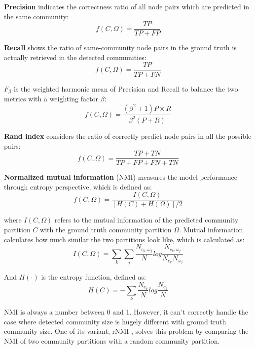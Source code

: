 \textbf{Precision} indicates the correctness ratio of all node pairs which are predicted in the same community:
\begin{equation}
f(C,\Omega) = \frac{TP}{TP+FP} 
\end{equation}

\textbf{Recall} shows the ratio of same-community node pairs in the ground truth is actually retrieved in the detected communities:
\begin{equation}
f(C,\Omega) = \frac{TP}{TP+FN} 
\end{equation}

\textbf{$F_\beta$} is the weighted harmonic mean of Precision and Recall to balance the two metrics with a weighting factor $\beta$:
\begin{equation}
f(C,\Omega) =\frac{(\beta^{2}+1)P\times R}{\beta^{2}(P+R)} 
\end{equation}

\textbf{Rand index} considers the ratio of correctly predict node pairs in all the possible pairs:
\begin{equation}
f(C,\Omega) = \frac{TP+TN}{TP+FP+FN+TN}
\end{equation}

\textbf{Normalized mutual information} (NMI) measures the model performance through entropy perspective, which is defined as: 
\begin{equation}
f(C,\Omega)  =  \frac{I(C,\Omega)}{[H(C)+H(\Omega)]/2}
\end{equation}

where $I(C,\Omega)$ refers to the mutual information of the predicted community partition $C$ with the ground truth community partition $\Omega$.  Mutual information calculates how much similar the two partitions look like, which is calculated as:
\begin{equation}
I(C,\Omega) = \sum_{k}\sum_{j}\frac{N_{c_{k},\omega_{j}}}{N} log \frac{N_{c_{k},\omega_{j}}}{N_{c_{k}}N_{\omega_{j}}}
\end{equation}

And $H(\cdot)$ is the entropy function, defined as:
\begin{equation}
H(C) = - \sum_{k} \frac{N_{c_k}}{N}log\frac{N_{c_k}}{N}
\end{equation}

NMI is always a number between 0 and 1. However, it can't correctly handle the case where detected community size is hugely different with ground truth community size. One of its variant, rNMI \cite{zhang2015evaluating}, solves this problem by comparing the NMI of two community partitions with a random community partition.
 
